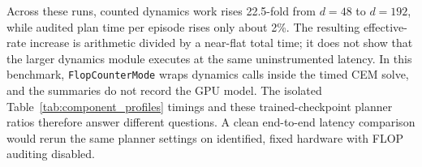 Across these runs, counted dynamics work rises 22.5-fold from $d=48$ to $d=192$, while audited plan time per episode rises only about 2\%. The resulting effective-rate increase is arithmetic divided by a near-flat total time; it does not show that the larger dynamics module executes at the same uninstrumented latency. In this benchmark, \texttt{FlopCounterMode} wraps dynamics calls inside the timed CEM solve, and the summaries do not record the GPU model. The isolated Table~\ref{tab:component_profiles} timings and these trained-checkpoint planner ratios therefore answer different questions. A clean end-to-end latency comparison would rerun the same planner settings on identified, fixed hardware with FLOP auditing disabled.
